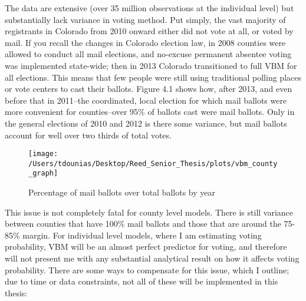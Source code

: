 \documentclass[12pt,twoside]{reedthesis}
\begin{document}
  The data are extensive (over 35 million observations at the individual
  level) but substantially lack variance in voting method. Put simply, the
  vast majority of registrants in Colorado from 2010 onward either did not
  vote at all, or voted by mail. If you recall the changes in Colorado
  election law, in 2008 counties were allowed to conduct all mail
  elections, and no-excuse permanent absentee voting was implemented
  state-wide; then in 2013 Colorado transitioned to full VBM for all
  elections. This means that few people were still using traditional
  polling places or vote centers to cast their ballots. Figure 4.1 shows
  how, after 2013, and even before that in 2011--the coordinated, local
  election for which mail ballots were more convenient for counties--over
  95\% of ballots cast were mail ballots. Only in the general elections of
  2010 and 2012 is there some variance, but mail ballots account for well
  over two thirds of total votes.
  
  \begin{figure}
  
  {\centering \texttt{[image: /Users/tdounias/Desktop/Reed\_Senior\_Thesis/plots/vbm\_county\_graph]} 
  
  }
  
  \caption[Percentage of mail ballots over total ballots by year]{Percentage of mail ballots over total ballots by year}\label{fig:vbm png}
  \end{figure}
  
  This issue is not completely fatal for county level models. There is
  still variance between counties that have 100\% mail ballots and those
  that are around the 75-85\% margin. For individual level models, where I
  am estimating voting probability, VBM will be an almost perfect
  predictor for voting, and therefore will not present me with any
  substantial analytical result on how it affects voting probability.
  There are some ways to compensate for this issue, which I outline; due
  to time or data constraints, not all of these will be implemented in
  this thesis:
  
\end{document}
